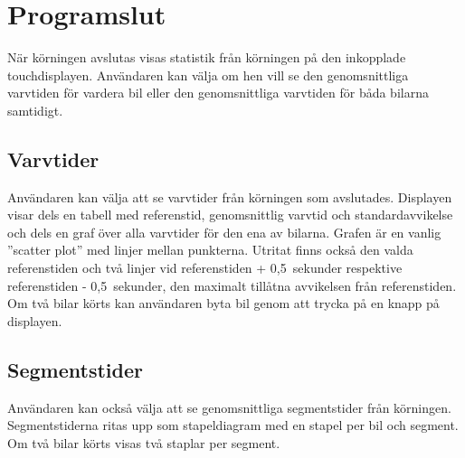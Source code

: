 \section{Programslut}
\label{sec:programslut}

När körningen avslutas visas statistik från körningen på den inkopplade
touchdisplayen. Användaren kan välja om hen vill se den genomsnittliga varvtiden
för vardera bil eller den genomsnittliga varvtiden för båda bilarna samtidigt.

\subsection{Varvtider}

Användaren kan välja att se varvtider från körningen som avslutades. Displayen
visar dels en tabell med referenstid, genomsnittlig varvtid och
standardavvikelse och dels en graf över alla varvtider för den ena av bilarna.
Grafen är en vanlig ''scatter plot'' med linjer mellan punkterna. Utritat finns
också den valda referenstiden och två linjer vid referenstiden + 0,5~sekunder
respektive referenstiden - 0,5~sekunder, den maximalt tillåtna avvikelsen från
referenstiden. Om två bilar körts kan användaren byta bil genom att trycka på en
knapp på displayen.

\subsection{Segmentstider}

Användaren kan också välja att se genomsnittliga segmentstider från körningen.
Segmentstiderna ritas upp som stapeldiagram med en stapel per bil och segment.
Om två bilar körts visas två staplar per segment.

